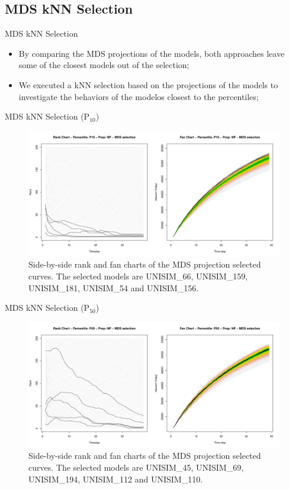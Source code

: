 \documentclass{beamer}
\begin{document}
\subsection{MDS kNN Selection}
\begin{frame}{MDS kNN Selection}
  \begin{itemize}
    \item By comparing the MDS projections of the models, both approaches leave some of the closest models out of the selection;
    \item We executed a kNN selection based on the projections of the models to investigate the behaviors of the modelos closest to the percentiles;
  \end{itemize}
\end{frame}

\begin{frame}{MDS kNN Selection (P$_{10}$)}
  \begin{figure}[H]
    \centering
    \includegraphics[width=0.9\columnwidth]{rank-fan-mds-sel-p10.pdf}
    \caption{Side-by-side rank and fan charts of the MDS projection selected curves. The selected models are UNISIM\_66, UNISIM\_159, UNISIM\_181, UNISIM\_54 and UNISIM\_156.}
    \label{fig:rank-fan-mds}
  \end{figure}
\end{frame}

\begin{frame}{MDS kNN Selection (P$_{50}$)}
  \begin{figure}[H]
    \centering
    \includegraphics[width=0.9\columnwidth]{rank-fan-mds-sel-p50.pdf}
    \caption{Side-by-side rank and fan charts of the MDS projection selected curves. The selected models are UNISIM\_45, UNISIM\_69, UNISIM\_194, UNISIM\_112 and UNISIM\_110.}
    \label{fig:rank-fan-mds}
  \end{figure}
\end{frame}
\end{document}
